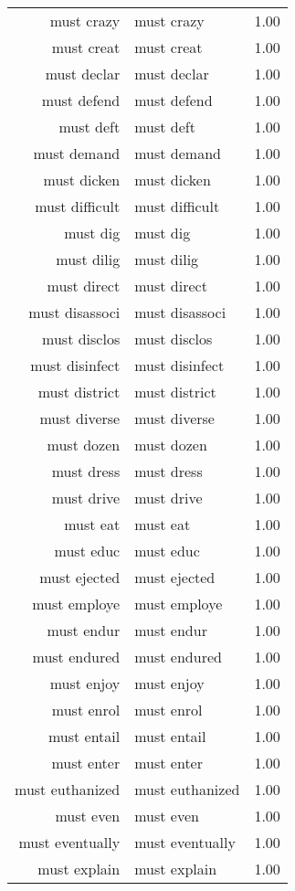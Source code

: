 \begin{table}[ht]
\begin{tabular}{rlr}
  must crazy & must crazy & 1.00 \\ 
  must creat & must creat & 1.00 \\ 
  must declar & must declar & 1.00 \\ 
  must defend & must defend & 1.00 \\ 
  must deft & must deft & 1.00 \\ 
  must demand & must demand & 1.00 \\ 
  must dicken & must dicken & 1.00 \\ 
  must difficult & must difficult & 1.00 \\ 
  must dig & must dig & 1.00 \\ 
  must dilig & must dilig & 1.00 \\ 
  must direct & must direct & 1.00 \\ 
  must disassoci & must disassoci & 1.00 \\ 
  must disclos & must disclos & 1.00 \\ 
  must disinfect & must disinfect & 1.00 \\ 
  must district & must district & 1.00 \\ 
  must diverse & must diverse & 1.00 \\ 
  must dozen & must dozen & 1.00 \\ 
  must dress & must dress & 1.00 \\ 
  must drive & must drive & 1.00 \\ 
  must eat & must eat & 1.00 \\ 
  must educ & must educ & 1.00 \\ 
  must ejected & must ejected & 1.00 \\ 
  must employe & must employe & 1.00 \\ 
  must endur & must endur & 1.00 \\ 
  must endured & must endured & 1.00 \\ 
  must enjoy & must enjoy & 1.00 \\ 
  must enrol & must enrol & 1.00 \\ 
  must entail & must entail & 1.00 \\ 
  must enter & must enter & 1.00 \\ 
  must euthanized & must euthanized & 1.00 \\ 
  must even & must even & 1.00 \\ 
  must eventually & must eventually & 1.00 \\ 
  must explain & must explain & 1.00 \\ 

\end{tabular}
\end{table}
